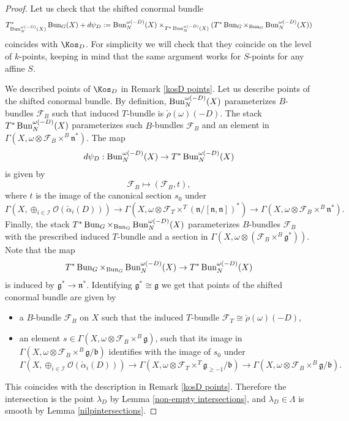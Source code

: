 \documentclass[9pt]{amsart}
\newcommand{\cF}{{\mathcal F}}
\newcommand{\cI}{{\mathcal I}}
\newcommand{\cO}{{\mathcal O}}
\numberwithin{equation}{section}
\begin{document}
\begin{proof}
	Let us check that the shifted conormal bundle $$T^*_{\operatorname{{Bun}}_N^{\omega(-D)}(X)} \operatorname{{Bun}}_G(X) + d\psi_D := \operatorname{{Bun}}_N^{\omega(-D)}(X) \times_{T^* \operatorname{{Bun}}_N^{\omega(-D)}(X)} (T^*\operatorname{{Bun}}_G \times_{\operatorname{{Bun}}_G} \operatorname{{Bun}}_N^{\omega(-D)}(X))$$
	coincides with $\Kos_D$. For simplicity we will check that they coincide on the level of $k$-points, keeping in mind that the same argument works for $S$-points for any affine $S$. 
	
	We described points of $\Kos_D$ in Remark \ref{kosD points}. Let us describe points of the shifted conormal bundle. 
	By definition, $\operatorname{{Bun}}_N^{\omega(-D)}(X) $ parameterizes $B$-bundles $\cF_B$ such that induced $T$-bundle is $\check{\rho}(\omega)(-D)$. The stack $T^* \operatorname{{Bun}}_N^{\omega(-D)}(X)$ parameterizes such $B$-bundles $\cF_B$ and an element in $\Gamma(X, \omega \otimes \cF_B \times^B \mathfrak{n}^*)$. The map
	$$d\psi_D: \operatorname{{Bun}}_N^{\omega(-D)}(X) \rightarrow T^* \operatorname{{Bun}}_N^{\omega(-D)}(X)$$
	is given by $$\cF_B \mapsto (\cF_B, t),$$ where $t$ is the image of the canonical section $s_0$ under 
	\begin{equation}\label{section canonical}
		\Gamma(X, \oplus_{i \in \cI} \cO(\check{\alpha}_i(D))) \rightarrow \Gamma(X, \omega \otimes \cF_T \times^T (\mathfrak{n}/[\mathfrak{n}, \mathfrak{n}])^*) \rightarrow \Gamma(X, \omega \otimes \cF_B \times^B \mathfrak{n}^*).
	\end{equation}
	Finally, the stack $T^*\operatorname{{Bun}}_G \times_{\operatorname{{Bun}}_G} \operatorname{{Bun}}_N^{\omega(-D)}(X)$ parameterizes $B$-bundles $\cF_B$ with the prescribed induced $T$-bundle and a section in $\Gamma(X, \omega \otimes (\cF_B \times^B \mathfrak{g}^*))$. Note that the map 
	$$T^*\operatorname{{Bun}}_G \times_{\operatorname{{Bun}}_G} \operatorname{{Bun}}_N^{\omega(-D)}(X) \rightarrow T^* \operatorname{{Bun}}_N^{\omega(-D)}(X) $$ is induced by $\mathfrak{g}^* \rightarrow \mathfrak{n}^*$.
	Identifying $\mathfrak{g}^* \cong \mathfrak{g}$ we get that points of the shifted conormal bundle are given by 
	\begin{itemize}
		\item a $B$-bundle $\cF_B$ on $X$ such that the induced $T$-bundle $\cF_T \cong \check{\rho}(\omega)(-D)$,
		\item an element $s \in \Gamma(X, \omega \otimes \cF_B \times^B \mathfrak{g})$, such that its image in $\Gamma(X, \omega \otimes \cF_B \times^B \mathfrak{g}/\mathfrak{b})$ identifies with the image of $s_0$ under
		$$\Gamma(X, \oplus_{i \in \cI} \cO(\check{\alpha}_i(D))) \rightarrow \Gamma(X, \omega \otimes \cF_T \times^T \mathfrak{g}_{\geq -1}/\mathfrak{b}) \rightarrow \Gamma(X, \omega \otimes \cF_B \times^B \mathfrak{g}/\mathfrak{b}).$$
	\end{itemize}
	This coincides with the description in Remark \ref{kosD points}. Therefore the intersection is the point $\lambda_D$ by Lemma \ref{non-empty intersections}, and $\lambda_D \in \Lambda$ is smooth by Lemma \ref{nilpintersections}.
\end{proof}
\end{document}
